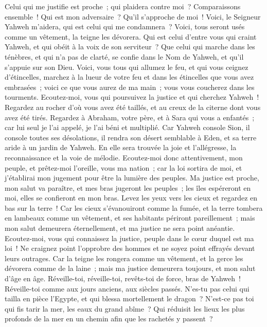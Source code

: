 \begin{multicols}{2}
Celui qui me justifie est proche~; qui plaidera contre moi~? Comparaissons ensemble~! Qui est mon adversaire~? Qu'il s'approche de moi~!
Voici, le Seigneur Yahweh m'aidera, qui est celui qui me condamnera~? Voici, tous seront usés comme un vêtement, la teigne les dévorera.
Qui est celui d'entre vous qui craint Yahweh, et qui obéit à la voix de son serviteur~? Que celui qui marche dans les ténèbres, et qui n'a pas de clarté, se confie dans le Nom de Yahweh, et qu'il s'appuie sur son Dieu.
Voici, vous tous qui allumez le feu, et qui vous ceignez d'étincelles, marchez à la lueur de votre feu et dans les étincelles que vous avez embrasées~; voici ce que vous aurez de ma main~; vous vous coucherez dans les tourments.
\VerseOne{}Ecoutez-moi, vous qui poursuivez la justice et qui cherchez Yahweh~! Regardez au rocher d'où vous avez été taillés, et au creux de la citerne dont vous avez été tirés.
Regardez à Abraham, votre père, et à Sara qui vous a enfantés~; car lui seul je l'ai appelé, je l'ai béni et multiplié.
Car Yahweh console Sion, il console toutes ses désolations, il rendra son désert semblable à Eden, et sa terre aride à un jardin de Yahweh. En elle sera trouvée la joie et l'allégresse, la reconnaissance et la voie de mélodie.
Ecoutez-moi donc attentivement, mon peuple, et prêtez-moi l'oreille, vous ma nation~; car la loi sortira de moi, et j'établirai mon jugement pour être la lumière des peuples.
Ma justice est proche, mon salut va paraître, et mes bras jugeront les peuples~; les îles espéreront en moi, elles se confieront en mon bras.
Levez les yeux vers les cieux et regardez en bas sur la terre~! Car les cieux s'évanouiront comme la fumée, et la terre tombera en lambeaux comme un vêtement, et ses habitants périront pareillement~; mais mon salut demeurera éternellement, et ma justice ne sera point anéantie.
Ecoutez-moi, vous qui connaissez la justice, peuple dans le cœur duquel est ma loi~! Ne craignez point l'opprobre des hommes et ne soyez point effrayés devant leurs outrages.
Car la teigne les rongera comme un vêtement, et la gerce les dévorera comme de la laine~; mais ma justice demeurera toujours, et mon salut d'âge en âge.
Réveille-toi, réveille-toi, revêts-toi de force, bras de Yahweh~! Réveille-toi comme aux jours anciens, aux siècles passés. N'es-tu pas celui qui tailla en pièce l'Egypte, et qui blessa mortellement le dragon~?
N'est-ce pas toi qui fis tarir la mer, les eaux du grand abîme~? Qui réduisit les lieux les plus profonds de la mer en un chemin afin que les rachetés y passent~?

\end{multicols}
